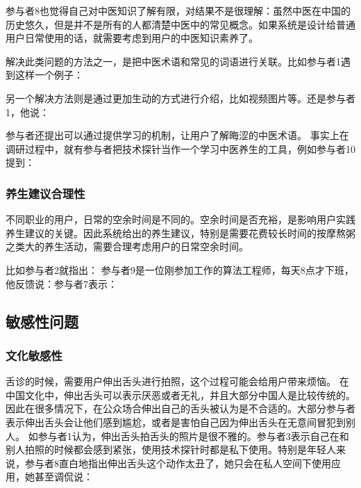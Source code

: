 参与者8也觉得自己对中医知识了解有限，对结果不是很理解：虽然中医在中国的历史悠久，但是并不是所有的人都清楚中医中的常见概念。如果系统是设计给普通用户日常使用的话，就需要考虑到用户的中医知识素养了。

解决此类问题的方法之一，是把中医术语和常见的词语进行关联。比如参与者1遇到这样一个例子：

另一个解决方法则是通过更加生动的方式进行介绍，比如视频图片等。还是参与者1，他说：

参与者还提出可以通过提供学习的机制，让用户了解晦涩的中医术语。
事实上在调研过程中，就有参与者把技术探针当作一个学习中医养生的工具，例如参与者10提到：

\subsubsection{养生建议合理性}

不同职业的用户，日常的空余时间是不同的。空余时间是否充裕，是影响用户实践养生建议的关键。因此系统给出的养生建议，特别是需要花费较长时间的按摩熬粥之类大的养生活动，需要合理考虑用户的日常空余时间。

比如参与者2就指出：
参与者9是一位刚参加工作的算法工程师，每天8点才下班，他反馈说：参与者7表示：

\subsection{敏感性问题}

\subsubsection{文化敏感性}


舌诊的时候，需要用户伸出舌头进行拍照，这个过程可能会给用户带来烦恼。
在中国文化中，伸出舌头可以表示厌恶或者无礼，并且大部分中国人是比较传统的。因此在很多情况下，在公众场合伸出自己的舌头被认为是不合适的。大部分参与者表示伸出舌头会让他们感到尴尬，或者是害怕自己因为伸出舌头在无意间冒犯到别人。
如参与者1认为，伸出舌头拍舌头的照片是很不雅的。参与者3表示自己在和别人拍照的时候都会感到紧张，使用技术探针时都是私下使用。特别是年轻人来说，参与者8直白地指出伸出舌头这个动作太丑了，她只会在私人空间下使用应用，她甚至调侃说：

